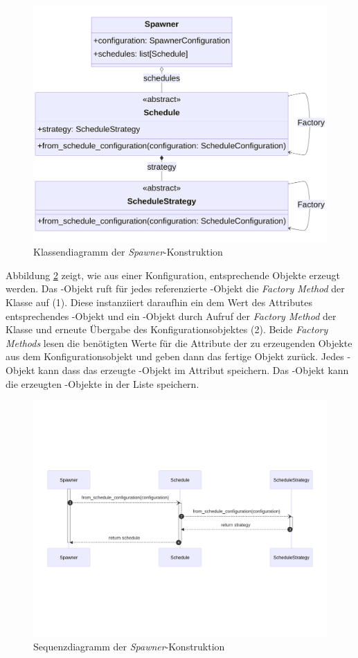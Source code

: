 \begin{figure}[htb]
	\centering
	\includegraphics[width=1.0\linewidth]{images/diagrams/spawner-factory-class.png}
	\caption{Klassendiagramm der \emph{Spawner}-Konstruktion}
	\label{fig:spawner-factory-class}
\end{figure}

Abbildung \ref{fig:spawner-factory-seq} zeigt, wie aus einer Konfiguration, entsprechende Objekte erzeugt werden. Das -Objekt ruft für jedes referenzierte -Objekt die \emph{Factory Method} der Klasse  auf (1). Diese instanziiert daraufhin ein dem Wert des Attributes  entsprechendes -Objekt und ein -Objekt durch Aufruf der \emph{Factory Method} der Klasse  und erneute Übergabe des Konfigurationsobjektes (2). Beide \emph{Factory Methods} lesen die benötigten Werte für die Attribute der zu erzeugenden Objekte aus dem Konfigurationsobjekt und geben dann das fertige Objekt zurück. Jedes -Objekt kann dass das erzeugte -Objekt im Attribut  speichern. Das -Objekt kann die erzeugten -Objekte in der Liste  speichern.

\begin{figure}[htb]
	\centering
	\includegraphics[width=1.0\linewidth]{images/diagrams/spawner-factory-seq.png}
	\caption{Sequenzdiagramm der \emph{Spawner}-Konstruktion}
	\label{fig:spawner-factory-seq}
\end{figure}
